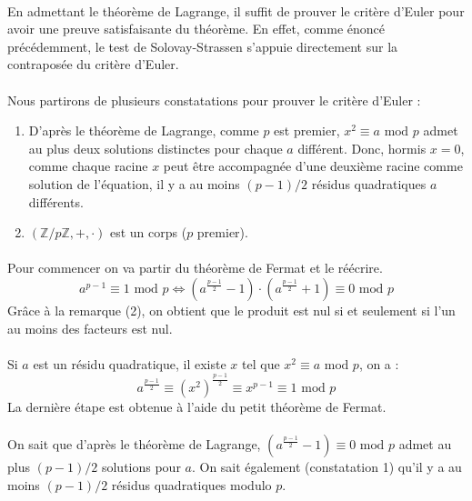 		\paragraph{}En admettant le théorème de Lagrange, il suffit de prouver le critère d'Euler pour avoir une preuve satisfaisante du théorème. En effet, comme énoncé précédemment, le test de Solovay-Strassen s'appuie directement sur la contraposée du critère d'Euler.
		\paragraph{}Nous partirons de plusieurs constatations pour prouver le critère d'Euler :\\
		\begin{enumerate}
		\item D'après le théorème de Lagrange, comme $p$ est premier, $x^{2} \equiv a \text{ mod } p$ admet au plus deux solutions distinctes pour chaque $a$ différent. Donc, hormis $x = 0$, comme chaque racine $x$ peut être accompagnée d'une deuxième racine comme solution de l'équation, il y a au moins $(p - 1)/2$ résidus quadratiques $a$ différents. 
		\item $(\mathbb{Z}/p\mathbb{Z}, +, \cdot)$ est un corps ($p$ premier).
		\end{enumerate}
		
		\paragraph{}Pour commencer on va partir du théorème de Fermat et le réécrire.
		\[a^{p-1} \equiv 1 \text{ mod } p \iff (a^{\frac{p-1}{2}} - 1) \cdot (a^{\frac{p-1}{2}} + 1) \equiv 0 \text{ mod } p\]
		Grâce à la remarque (2), on obtient que le produit est nul si et seulement si l'un au moins des facteurs est nul.
		
		\paragraph{}Si $a$ est un résidu quadratique, il existe $x$ tel que $x^{2} \equiv a \text{ mod } p$, on a :\\
		\[
			a^{\frac{p-1}{2}} \equiv (x^{2})^{\frac{p-1}{2}} \equiv x^{p-1} \equiv 1 \text{ mod } p
		\]
		La dernière étape est obtenue à l'aide du petit théorème de Fermat.
		
		\paragraph{}On sait que d'après le théorème de Lagrange, $(a^{\frac{p-1}{2}} - 1) \equiv 0 \text{ mod } p$ admet au plus $(p-1)/2$ solutions pour $a$. On sait également (constatation 1) qu'il y a au moins $(p-1)/2$ résidus quadratiques modulo $p$.
